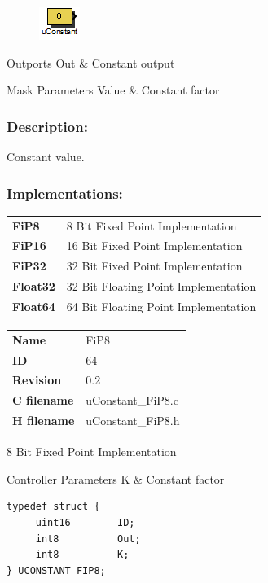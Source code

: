 \label{block:uConstant}
\begin{figure}[H]\includegraphics{uConstant}\end{figure} 

\begin{XtoCtabular}{Outports}
Out & Constant output\tabularnewline
\hline
\end{XtoCtabular}

\begin{XtoCtabular}{Mask Parameters}
Value & Constant factor\tabularnewline
\hline
\end{XtoCtabular}

\subsubsection*{Description:}
Constant value.

\subsubsection*{Implementations:}
\begin{tabular}{l l}
\textbf{FiP8} & 8 Bit Fixed Point Implementation\tabularnewline
\textbf{FiP16} & 16 Bit Fixed Point Implementation\tabularnewline
\textbf{FiP32} & 32 Bit Fixed Point Implementation\tabularnewline
\textbf{Float32} & 32 Bit Floating Point Implementation\tabularnewline
\textbf{Float64} & 64 Bit Floating Point Implementation\tabularnewline
\end{tabular}

\nopagebreak[0]
\begin{tabular}{l l}
\textbf{Name} & FiP8 \tabularnewline
\textbf{ID} & 64 \tabularnewline
\textbf{Revision} & 0.2 \tabularnewline
\textbf{C filename} & uConstant\_FiP8.c \tabularnewline
\textbf{H filename} & uConstant\_FiP8.h \tabularnewline
\end{tabular}
\vspace{1ex}

8 Bit Fixed Point Implementation

\begin{XtoCtabular}{Controller Parameters}
K & Constant factor\tabularnewline
\hline
\end{XtoCtabular}

\begin{lstlisting}
typedef struct {
     uint16        ID;
     int8          Out;
     int8          K;
} UCONSTANT_FIP8;
\end{lstlisting}

